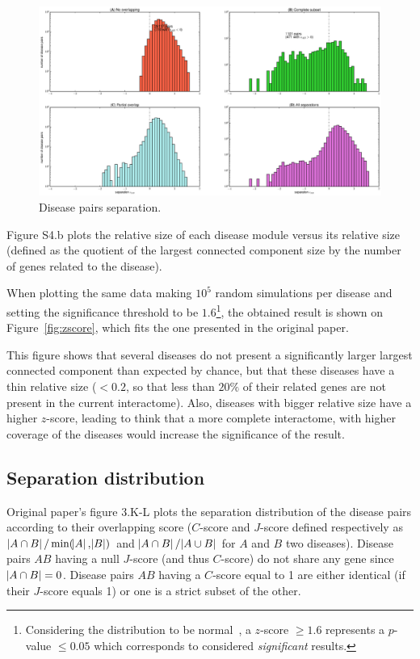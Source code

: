 \documentclass[letterpaper]{article}
\begin{document}
	\begin{figure}[!b]
		\hspace{-1.8cm}
		\vspace{-1cm}
		\includegraphics[scale=.35]{images/s_AB_histograms.eps}
		\caption{Disease pairs separation.\label{fig:s_AB histogram}}

	\end{figure}
	Figure S4.b plots the relative size of each disease module versus its relative size (defined as the
	quotient of the largest connected component size by the number of genes related to the disease).

	When plotting the same data making $10^5$ random simulations per disease and setting the significance
	threshold to be $1.6$\footnote{Considering the distribution to be normal~\citep{fluctuationGiantComponent},
	a $z$-score $\geq 1.6$ represents a $p$-value $\leq 0.05$ which corresponds to considered
	\textit{significant} results.}, the obtained result is shown on
	Figure~\ref{fig:zscore}, which fits the one presented in the original paper.

	This figure shows that several diseases do not present a significantly larger largest connected component
	than expected by chance, but that these diseases have a thin relative size ($< 0.2$, so that less than $20\%$
	of their related genes are not present in the current interactome). Also, diseases with bigger relative size
	have a higher $z$-score, leading to think that a more complete interactome, with higher coverage of the diseases
	would increase the significance of the result.

	\subsection{Separation distribution}
	Original paper's figure 3.K-L plots the separation distribution of the disease pairs according to their
	overlapping score ($C$-score and $J$-score defined respectively as $\abs {A \cap B}/\min(\abs A, \abs B)$ and
	$\abs {A \cap B}/\abs {A \cup B}$ for $A$ and $B$ two diseases). Disease pairs $AB$ having a null $J$-score
	(and thus $C$-score) do not share any gene since $\abs {A \cap B} = 0$. Disease pairs $AB$ having a $C$-score
	equal to 1 are either identical (if their $J$-score equals 1) or one is a strict subset of the other.
\end{document}
